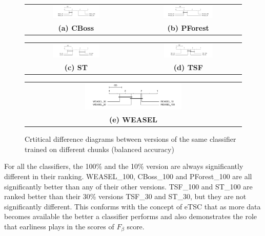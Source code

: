 \begin{figure} [!htb]
  \centering
  \begin{tabular}{ccc}
  \includegraphics[width=0.49\textwidth]{cd_accuracy_within_cboss.png} & & 
  \includegraphics[width=0.49\textwidth]{cd_accuracy_within_pforest.png} \\
  \textbf{(a) CBoss} & & \textbf{(b) PForest} \\[6pt]
  \end{tabular}
  \begin{tabular}{ccc}
  \includegraphics[width=0.49\textwidth]{cd_accuracy_within_st.png} & & 
  \includegraphics[width=0.49\textwidth]{cd_accuracy_within_tsf.png} \\
  \textbf{(c) ST} & & \textbf{(d) TSF}  \\[6pt]
  \end{tabular}
  \begin{tabular}{ccc}
  & \includegraphics[width=0.49\textwidth]{cd_f_score_within_weasel.png} & \\
  & \textbf{(e) WEASEL} & \\[6pt]
  \end{tabular}
  \caption{Crtitical difference diagrams between versions of the same classifier trained on different chunks (balanced accuracy)}
  \label{fig:withinacc}
\end{figure}

For all the classifiers, the 100\% and the 10\% version are always significantly different in their ranking.
WEASEL\_100, CBoss\_100 and PForest\_100 are all significantly better than any of their other versions.
TSF\_100 and ST\_100 are ranked better than their 30\% versions TSF\_30 and ST\_30, but they are not significantly different.
This conforms with the concept of eTSC that as more data becomes available the better a classifier performs
and also demonstrates the role that earliness plays in the scores of $F_{\beta}$ score.


